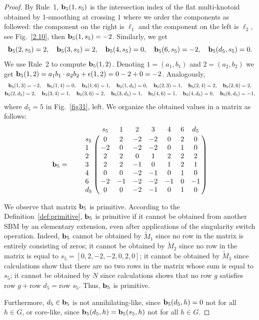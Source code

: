 \documentclass[11pt]{amsart}
\theoremstyle{noparens}
\numberwithin{equation}{section}
\numberwithin{equation}{section}
\begin{document}
\begin{proof}
By Rule~1, ${\bf b}_5(1, s_5)$ is the intersection index of the flat multi-knotoid obtained by 1-smoothing at crossing $1$ where we order the components as followed: the component on the right is $\ell_1$ and the component on the left is $\ell_2$, see Fig.~\ref{2.10}, then ${\bf b}_5(1, s_5)=-2$. Similarly, we get 
$$
{\bf b}_5(2, s_{5})=2, \quad {\bf b}_5(3, s_5)=2, \quad {\bf b}_5(4, s_5)=0, \quad {\bf b}_5(6, s_5)=-2, \quad {\bf b}_5(d_5, s_5)=0.
$$ 
We use Rule~2 to compute ${\bf b}_5(1, 2)$. Denoting $1=(a_1,b_1)$ and $2=(a_2,b_2)$ we get ${\bf b}_5(1, 2) = a_1b_1 \cdot a_2 b_2 + \epsilon(1,2) =0-2+0=-2$. 
Analogously, 
$$
\begin{gathered} 
{\bf b}_5(1, 3)=-2, \quad {\bf b}_5(1, 4)=0, \quad {\bf b}_5(1, 6)=1, \quad {\bf b}_5(1, d_5)=0, \quad {\bf b}_5(2, 3)=1, \quad  {\bf b}_5(2, 4)=2, \quad {\bf b}_5(2, 6) = 2, \cr 
{\bf b}_5(2, d_5)=2, \quad {\bf b}_5(3, 4)=1, \quad {\bf b}_5(3, 6)=2, \quad  {\bf b}_5(3, d_5)=1, \quad {\bf b}_5(4, 6)=1,  \quad {\bf b}_5(4, d_5)=0, \quad {\bf b}_5(6, d_5)=-1,
\end{gathered}
$$
where $d_5=5$ in Fig.~\ref{fig31}, left. We organize the obtained values in a matrix as follows: 
$$
{\bf b}_5 = \qquad \bordermatrix{
	& s_5 & 1 &  2 & 3 & 4 & 6 & d_5  \cr
	s_5   & 0 &  2 &-2 &-2 & 0 & 2 & 0\cr
	1   &-2 &  0 &-2 &-2 & 0 & 1 & 0\cr
	2   & 2 &  2 & 0 & 1 & 2 & 2 & 2\cr
	3   & 2 &  2 &-1 & 0 & 1 & 2 & 1\cr
	4   & 0 &  0 &-2 &-1 & 0 & 1 & 0\cr
	6   &-2 & -1 &-2 &-2 &-1 & 0 &-1\cr 
	d_5   & 0 &  0 &-2 &-1 & 0 & 1 & 0\cr 
}
$$

We observe that matrix ${\bf b}_5$ is primitive. According to the Definition~\ref{def:primitive}, ${\bf b}_5$ is primitive if it cannot be obtained from another SBM by an elementary extension, even after applications of the singularity switch operation. Indeed, ${\bf b}_5$ cannot be  obtained by $\widetilde{M}_1$ since no row in the matrix is entirely consisting of zeros; it cannot be obtained by $\widetilde{M}_2$ since no row in the matrix is equal to $s_5 = [0, 2, -2, -2, 0, 2, 0]$; it cannot be obtained by $\widetilde{M}_3$ since calculations show that there are no two rows in the matrix whose sum is equal to $s_5$; it cannot be obtained by $N$ since calculations shows that no row $g$ satisfies $\text{row } g + \text{row } d_5 = \text{row } s_5$. Thus, ${\bf b}_5$ is primitive.

Furthermore, $d_5 \in {\bf b}_5$ is not annihilating-like, since ${\bf b}_5 (d_5, h) = 0$ not for all $h\in G$, or core-like, since ${\bf b}_5 (d_5, h) = {\bf b}_5 (s_5, h)$ not for all $h\in G$. 


\end{proof}
\end{document}
